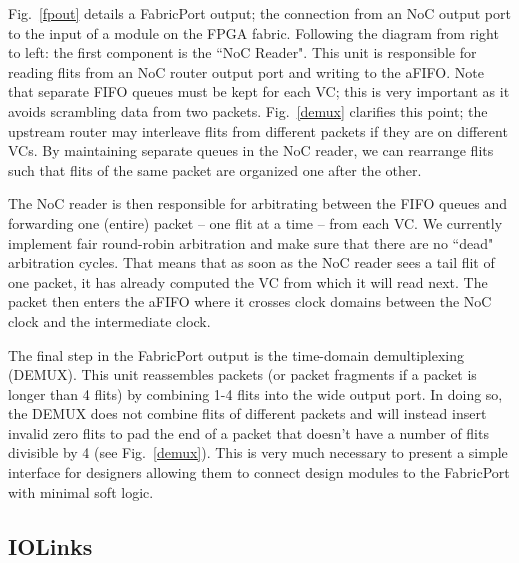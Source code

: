 Fig.~\ref{fpout} details a FabricPort output; the connection from an NoC output port to the input of a module on the FPGA fabric.
Following the diagram from right to left: the first component is the ``NoC Reader".
This unit is responsible for reading flits from an NoC router output port and writing to the aFIFO.
Note that separate FIFO queues must be kept for each VC; this is very important as it avoids scrambling data from two packets.
Fig.~\ref{demux} clarifies this point; the upstream router may interleave flits from different packets if they are on different VCs.
By maintaining separate queues in the NoC reader, we can rearrange flits such that flits of the same packet are organized one after the other.

The NoC reader is then responsible for arbitrating between the FIFO queues and forwarding one (entire) packet -- one flit at a time -- from each VC.
We currently implement fair round-robin arbitration and make sure that there are no ``dead" arbitration cycles.
That means that as soon as the NoC reader sees a tail flit of one packet, it has already computed the VC from which it will read next.
The packet then enters the aFIFO where it crosses clock domains between the NoC clock and the intermediate clock.

The final step in the FabricPort output is the time-domain demultiplexing (DEMUX).
This unit reassembles packets (or packet fragments if a packet is longer than 4 flits) by combining 1-4 flits into the wide output port.
In doing so, the DEMUX does not combine flits of different packets and will instead insert invalid zero flits to pad the end of a packet that doesn't have a number of flits divisible by 4 (see Fig.~\ref{demux}).
This is very much necessary to present a simple interface for designers allowing them to connect design modules to the FabricPort with minimal soft logic.


%
%



%
\subsection{IOLinks}
%


